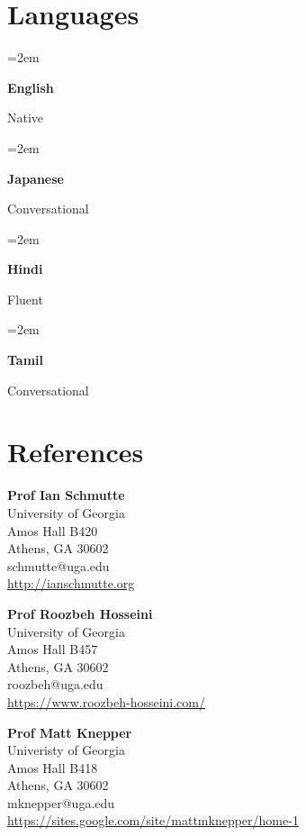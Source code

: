 \documentclass[]{article}
\newlength{\spacebox}
\newcommand{\lan}[2]{
    \noindent\hangindent=2em\hangafter=0
    \parbox{\spacebox}{%
        \textbf{#1}} %
     #2 \par
}%
\begin{document}
\section*{Languages}
\lan{English}{Native} %
\lan{Japanese}{Conversational} %
\lan{Hindi}{Fluent} %
\lan{Tamil}{Conversational} %
\section*{References}
\begin{minipage}[t]{0.34\textwidth}

  \textbf{Prof Ian Schmutte}\\
  University of Georgia\\
  Amos Hall B420\\
  Athens, GA 30602 \\
  schmutte@uga.edu\\
  \url{http://ianschmutte.org}
\end{minipage}
\begin{minipage}[t]{0.33\textwidth}

  \textbf{Prof Roozbeh Hosseini}\\
  University of Georgia\\
  Amos Hall B457\\
  Athens, GA 30602\\
  roozbeh@uga.edu\\
  \url{https://www.roozbeh-hosseini.com/}
\end{minipage}
\begin{minipage}[t]{0.33\textwidth}

  \textbf{Prof Matt Knepper}\\
  Univeristy of Georgia\\
  Amos Hall B418\\
  Athens, GA 30602\\
  mknepper@uga.edu\\
  \url{https://sites.google.com/site/mattmknepper/home-1}
\end{minipage}
\end{document}
